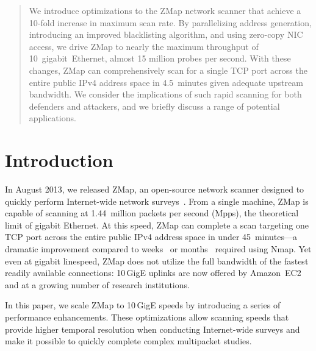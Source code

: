 \begin{abstract}
We introduce optimizations to the ZMap network scanner that achieve a 10-fold
increase in maximum scan rate. By parallelizing address generation,
introducing an improved blacklisting algorithm, and using zero-copy NIC
access, we drive ZMap to nearly the maximum throughput of
10~gigabit~Ethernet, almost 15 million probes per second. With these changes,
ZMap can comprehensively scan for a single TCP port across the entire public
IPv4 address space in 4.5~minutes given adequate upstream bandwidth. We
consider the implications of such rapid scanning for both defenders and
attackers, and we briefly discuss a range of potential
applications.
\end{abstract}

\section{Introduction}
\label{sec:introduction}

In August 2013, we released ZMap, an open-source network scanner designed to
quickly perform Internet-wide network surveys~\cite{zmap-2013}. From a single
machine, ZMap is capable of scanning at 1.44~million packets per second
(Mpps), the theoretical limit of gigabit Ethernet. At this speed, ZMap can
complete a scan targeting one TCP port across the entire public IPv4 address
space in under 45~minutes---a dramatic improvement compared to
weeks~\cite{zmap-2013} or months~\cite{ssl-observatory-2010} required using Nmap. Yet
even at gigabit linespeed, ZMap does not utilize the full bandwidth of the
fastest readily available connections: 10\,GigE uplinks are now offered by
Amazon~EC2~\cite{amazon-10g} and at a growing number of research
institutions. 

In this paper, we scale ZMap to 10\,GigE speeds by introducing a series of
performance enhancements. These optimizations allow scanning speeds that
provide higher temporal resolution when conducting Internet-wide surveys and
make it possible to quickly complete complex multipacket studies.

